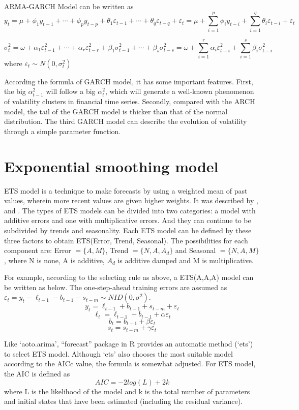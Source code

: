 \documentclass{monashthesis}
\theoremstyle{definition}
\theoremstyle{definition}
\theoremstyle{definition}
\theoremstyle{remark}
\begin{document}
ARMA-GARCH Model can be written as
\[y_t=\mu+\phi_1y_{t-1}+\cdots+\phi_py_{t-p}+\theta_1\varepsilon_{t-1}+\cdots+\theta_q\varepsilon_{t-q}+\varepsilon_t=\mu+\sum_{i=1}^p\phi_iy_{t-i}+\sum_{i=1}^q\theta_i\varepsilon_{t-i}+\varepsilon_t\]

\[\sigma_t^2=\omega+\alpha_1\varepsilon_{t-1}^2+\cdots+\alpha_r\varepsilon_{t-r}^2+\beta_1\sigma_{t-1}^2+\cdots+\beta_s\sigma_{t-s}^2=\omega+\sum_{i=1}^r\alpha_i\varepsilon_{t-i}^2+\sum_{i=1}^s\beta_i\sigma_{t-i}^2\]
where \(\varepsilon_t\sim{N(0,\sigma_t^2)}\)

According the formula of GARCH model, it has some important features.
First, the big \(\alpha_{t-1}^2\) will follow a big \(\alpha_t^2\),
which will generate a well-known phenomenon of volatility clusters in
financial time series. Secondly, compared with the ARCH model, the tail
of the GARCH model is thicker than that of the normal distribution. The
third GARCH model can describe the evolution of volatility through a
simple parameter function.

\section{Exponential smoothing model}\label{exponential-smoothing-model}

ETS model is a technique to make forecasts by using a weighted mean of
past values, wherein more recent values are given higher weights. It was
described by \textcite{B59}, \textcite{H57} and \textcite{W60}. The
types of ETS models can be divided into two categories: a model with
additive errors and one with multiplicative errors. And they can
continue to be subdivided by trends and seasonality. Each ETS model can
be defined by these three factors to obtain ETS(Error, Trend, Seasonal).
The possibilities for each component are: Error \(=\{A,M\}\), Trend
\(=\{N,A,A_d\}\) and Seasonal \(=\{N,A,M\}\), where N is none, A is
additive, \(A_d\) is additive damped and M is multiplicative.

For example, according to the selecting rule as above, a ETS(A,A,A)
model can be written as below. The one-step-ahead training errors are
assumed as
\(\varepsilon_t=y_t-\ell_{t-1}-b_{t-1}-s_{t-m}\sim{NID(0,\sigma^2)}\).
\[y_t=\ell_{t-1}+b_{t-1}+s_{t-m}+\varepsilon_t\]
\[\ell_t=\ell_{t-1}+b_{t-1}+\alpha\varepsilon_t\]
\[b_t=b_{t-1}+\beta\varepsilon_t\] \[s_t=s_{t-m}+\gamma\varepsilon_t\]

Like `aoto.arima', ``forecast'' package in R provides an automatic
method (`ets') to select ETS model. Although `ets' also chooses the most
suitable model according to the AICc value, the formula is somewhat
adjusted. For ETS model, the AIC is defined as \[AIC=-2log(L)+2k\] where
L is the likelihood of the model and k is the total number of parameters
and initial states that have been estimated (including the residual
variance).
\end{document}
